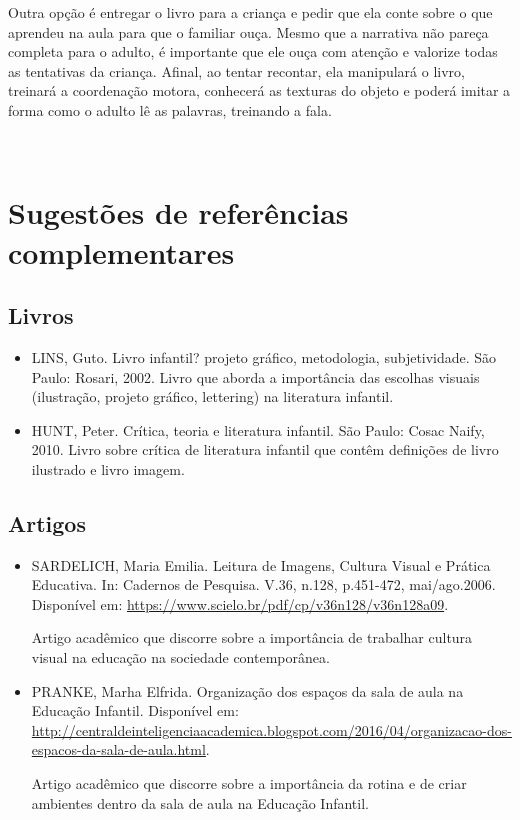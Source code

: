 \documentclass[11pt]{extarticle}
\begin{document}
\begin{enumerate}
Outra opção é entregar o livro para a criança e pedir que ela conte 
sobre o que aprendeu na aula para que o familiar ouça. Mesmo que a narrativa não pareça 
completa para o adulto, é importante que ele ouça com atenção e 
valorize todas as tentativas da criança. Afinal, ao tentar recontar, 
ela manipulará o livro, treinará a coordenação motora, conhecerá as texturas 
do objeto e poderá imitar a forma como o adulto 
lê as palavras, treinando a fala. 
\end{enumerate}

 
\section{Sugestões de referências complementares}

\subsection{Livros} 

\begin{itemize}
\item LINS, Guto. Livro infantil? projeto gráfico, metodologia, subjetividade. São Paulo: Rosari, 2002.
Livro que aborda a importância das escolhas visuais (ilustração, projeto gráfico, lettering) na literatura infantil.  

\item HUNT, Peter. Crítica, teoria e literatura infantil. São Paulo: Cosac Naify, 2010.
Livro sobre crítica de literatura infantil que contêm definições de livro ilustrado e livro imagem. 
\end{itemize}

\subsection{Artigos}

\begin{itemize}
\item SARDELICH, Maria Emilia. Leitura de Imagens, Cultura Visual e Prática Educativa. 
In: Cadernos de Pesquisa. V.36, n.128, p.451-472, mai/ago.2006. Disponível em: \url{https://www.scielo.br/pdf/cp/v36n128/v36n128a09}. %

Artigo acadêmico que discorre sobre a importância de trabalhar cultura 
visual na educação na sociedade contemporânea. 

\item PRANKE, Marha Elfrida. Organização dos espaços da sala de aula na Educação Infantil. Disponível em: \url{http://centraldeinteligenciaacademica.blogspot.com/2016/04/organizacao-dos-espacos-da-sala-de-aula.html}. %

Artigo acadêmico que discorre sobre a importância da rotina e de criar ambientes dentro da sala de aula na Educação Infantil.  
\end{itemize}
\end{document}
